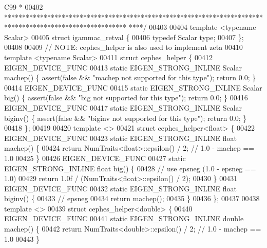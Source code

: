 \begin{DoxyCode}
{      C99 *}
00402 \textcolor{comment}{ **********************************************************************************************************
      ****/}
00403 
00404 \textcolor{keyword}{template} <\textcolor{keyword}{typename} Scalar>
00405 \textcolor{keyword}{struct }igammac\_retval \{
00406   \textcolor{keyword}{typedef} Scalar type;
00407 \};
00408 
00409 \textcolor{comment}{// NOTE: cephes\_helper is also used to implement zeta}
00410 \textcolor{keyword}{template} <\textcolor{keyword}{typename} Scalar>
00411 \textcolor{keyword}{struct }cephes\_helper \{
00412   EIGEN\_DEVICE\_FUNC
00413   \textcolor{keyword}{static} EIGEN\_STRONG\_INLINE Scalar machep() \{ assert(\textcolor{keyword}{false} && \textcolor{stringliteral}{"machep not supported for this type"}); \textcolor{keywordflow}{
      return} 0.0; \}
00414   EIGEN\_DEVICE\_FUNC
00415   \textcolor{keyword}{static} EIGEN\_STRONG\_INLINE Scalar big() \{ assert(\textcolor{keyword}{false} && \textcolor{stringliteral}{"big not supported for this type"}); \textcolor{keywordflow}{return} 0.0;
       \}
00416   EIGEN\_DEVICE\_FUNC
00417   \textcolor{keyword}{static} EIGEN\_STRONG\_INLINE Scalar biginv() \{ assert(\textcolor{keyword}{false} && \textcolor{stringliteral}{"biginv not supported for this type"}); \textcolor{keywordflow}{
      return} 0.0; \}
00418 \};
00419 
00420 \textcolor{keyword}{template} <>
00421 \textcolor{keyword}{struct }cephes\_helper<float> \{
00422   EIGEN\_DEVICE\_FUNC
00423   \textcolor{keyword}{static} EIGEN\_STRONG\_INLINE \textcolor{keywordtype}{float} machep() \{
00424     \textcolor{keywordflow}{return} NumTraits<float>::epsilon() / 2;  \textcolor{comment}{// 1.0 - machep == 1.0}
00425   \}
00426   EIGEN\_DEVICE\_FUNC
00427   \textcolor{keyword}{static} EIGEN\_STRONG\_INLINE \textcolor{keywordtype}{float} big() \{
00428     \textcolor{comment}{// use epsneg (1.0 - epsneg == 1.0)}
00429     \textcolor{keywordflow}{return} 1.0f / (NumTraits<float>::epsilon() / 2);
00430   \}
00431   EIGEN\_DEVICE\_FUNC
00432   \textcolor{keyword}{static} EIGEN\_STRONG\_INLINE \textcolor{keywordtype}{float} biginv() \{
00433     \textcolor{comment}{// epsneg}
00434     \textcolor{keywordflow}{return} machep();
00435   \}
00436 \};
00437 
00438 \textcolor{keyword}{template} <>
00439 \textcolor{keyword}{struct }cephes\_helper<double> \{
00440   EIGEN\_DEVICE\_FUNC
00441   \textcolor{keyword}{static} EIGEN\_STRONG\_INLINE \textcolor{keywordtype}{double} machep() \{
00442     \textcolor{keywordflow}{return} NumTraits<double>::epsilon() / 2;  \textcolor{comment}{// 1.0 - machep == 1.0}
00443   \}

\end{DoxyCode}
